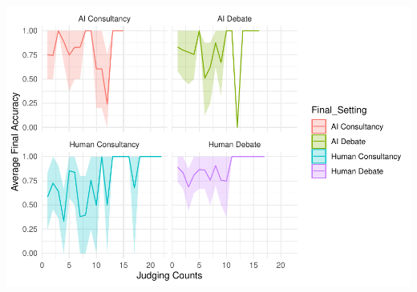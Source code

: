 \documentclass[
]{article}
\begin{document}
\includegraphics[width=1\linewidth]{debate-2309_files/figure-latex/unnamed-chunk-2-1}
\end{document}
